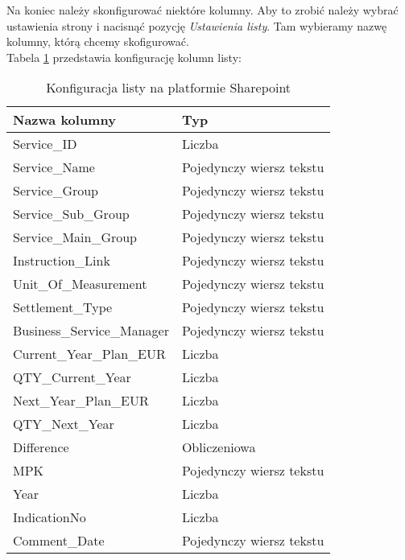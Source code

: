 Na koniec należy skonfigurować niektóre kolumny. Aby to zrobić należy wybrać ustawienia strony i nacisnąć pozycję \emph{Ustawienia listy}. Tam wybieramy nazwę kolumny, którą chcemy skofigurować.\\
Tabela \ref{tab:SharepointList} przedstawia konfigurację kolumn listy:
\begin{table}[h]
    \centering
    \caption{Konfiguracja listy na platformie Sharepoint}
    \label{tab:SharepointList}
    \begin{tabular}{|l|l|}
        \hline
        \textbf{Nazwa kolumny}     & \textbf{Typ}             \\ \hline
        Service\_ID                & Liczba                   \\ \hline
        Service\_Name              & Pojedynczy wiersz tekstu \\ \hline
        Service\_Group             & Pojedynczy wiersz tekstu \\ \hline
        Service\_Sub\_Group        & Pojedynczy wiersz tekstu \\ \hline
        Service\_Main\_Group       & Pojedynczy wiersz tekstu \\ \hline
        Instruction\_Link          & Pojedynczy wiersz tekstu \\ \hline
        Unit\_Of\_Measurement      & Pojedynczy wiersz tekstu \\ \hline
        Settlement\_Type           & Pojedynczy wiersz tekstu \\ \hline
        Business\_Service\_Manager & Pojedynczy wiersz tekstu \\ \hline
        Current\_Year\_Plan\_EUR   & Liczba                   \\ \hline
        QTY\_Current\_Year         & Liczba                   \\ \hline
        Next\_Year\_Plan\_EUR      & Liczba                   \\ \hline
        QTY\_Next\_Year            & Liczba                   \\ \hline
        Difference                 & Obliczeniowa             \\ \hline
        MPK                        & Pojedynczy wiersz tekstu \\ \hline
        Year                       & Liczba                   \\ \hline
        IndicationNo               & Liczba                   \\ \hline
        Comment\_Date              & Pojedynczy wiersz tekstu \\ \hline

\end{tabular}
\end{table}
